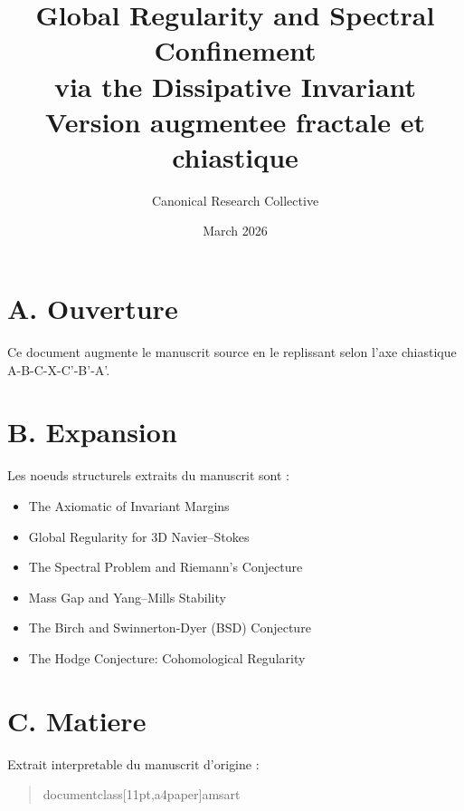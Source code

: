 \documentclass[11pt,a4paper]{article}
\title{Global Regularity and Spectral Confinement\\ via the Dissipative Invariant \\ \large Version augmentee fractale et chiastique}
\author{Canonical Research Collective}
\date{March 2026}
\begin{document}
\maketitle

\section*{A. Ouverture}
Ce document augmente le manuscrit source en le replissant selon l'axe chiastique A-B-C-X-C'-B'-A'.

\section*{B. Expansion}
Les noeuds structurels extraits du manuscrit sont :
\begin{itemize}[leftmargin=1.2cm]
\item The Axiomatic of Invariant Margins
\item Global Regularity for 3D Navier--Stokes
\item The Spectral Problem and Riemann's Conjecture
\item Mass Gap and Yang--Mills Stability
\item The Birch and Swinnerton-Dyer (BSD) Conjecture
\item The Hodge Conjecture: Cohomological Regularity
\end{itemize}

\section*{C. Matiere}
Extrait interpretable du manuscrit d'origine :
\begin{quote}
documentclass[11pt,a4paper]{amsart} %
\end{quote}
\end{document}
